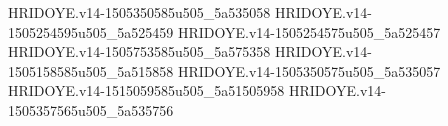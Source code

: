 HRIDOYE.v14-1505350585u505_5a535058
HRIDOYE.v14-1505254595u505_5a525459
HRIDOYE.v14-1505254575u505_5a525457
HRIDOYE.v14-1505753585u505_5a575358
HRIDOYE.v14-1505158585u505_5a515858
HRIDOYE.v14-1505350575u505_5a535057
HRIDOYE.v14-1515059585u505_5a51505958
HRIDOYE.v14-1505357565u505_5a535756

